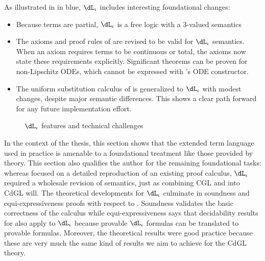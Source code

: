 \documentclass[12pt]{cmuthesis}
\theoremstyle{definition}
\theoremstyle{remark}
\newcommand{\rref}[2][]{\prettyref{#2}}
\newcommand{\CGL}{\textsf{CGL}\xspace}
\newcommand{\CdGL}{\textsf{CdGL}\xspace}
\newcommand{\dLi}{\ensuremath{\dL_\iota}\xspace}
\begin{document}
As illustrated in \rref{fig:dli-overview} in blue, \dLi includes interesting foundational changes:
\begin{itemize}
\item Because terms are partial, \dLi is a free logic with a 3-valued semantics
\item The axioms and proof rules of \dL are revised to be valid for \dLi semantics.
When an axiom requires terms to be continuous or total, the axioms now state these requirements explicitly.
Significant theorems can be proven for non-Lipschitz ODEs, which cannot be expressed with \dL's ODE constructor.
\item The uniform substitution calculus of \dL is generalized to \dLi with modest changes, despite major semantic differences.
This shows a clear path forward for any future implementation effort.
\end{itemize}

\begin{figure}
\centering
\caption{\dLi features and technical challenges}
\label{fig:dli-overview}
\end{figure}

In the context of the thesis, this section shows that the extended term language used in practice is amenable to a foundational treatment like those provided by theory.
This section also qualifies the author for the remaining foundational tasks: whereas \rref{sec:isabelle-fml} focused on a detailed reproduction of an existing proof calculus, 
\dLi required a wholesale revision of \dL semantics, just as combining \CGL and \dGL into \CdGL will.
The theoretical developments for \dLi culminate in soundness and equi-expressiveness proofs with respect to \dL.
Soundness validates the basic correctness of the calculus while equi-expressiveness says that decidability results for \dL also apply to \dLi because provable \dLi formulas can be translated to provable \dL formulas.
Moreover, the theoretical results were good practice because these are very much the same kind of results we aim to achieve for the \CdGL theory.
\end{document}
